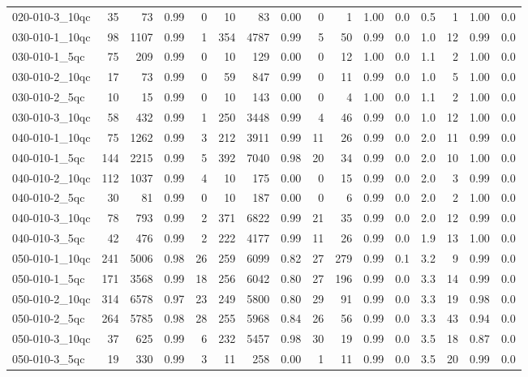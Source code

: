 \documentclass[twoside]{article}
\begin{document}
\begin{longtable}{l|rrrr|rrrr|rrr|rrrr}
		020-010-3\_10qc & 35 & 73 & 0.99 & 0 & 10 & 83 & 0.00 & 0 & 1 & 1.00 & 0.0 & 0.5 & 1 & 1.00 & 0.0 \\
		030-010-1\_10qc & 98 & 1107 & 0.99 & 1 & 354 & 4787 & 0.99 & 5 & 50 & 0.99 & 0.0 & 1.0 & 12 & 0.99 & 0.0 \\
		030-010-1\_5qc & 75 & 209 & 0.99 & 0 & 10 & 129 & 0.00 & 0 & 12 & 1.00 & 0.0 & 1.1 & 2 & 1.00 & 0.0 \\
		030-010-2\_10qc & 17 & 73 & 0.99 & 0 & 59 & 847 & 0.99 & 0 & 11 & 0.99 & 0.0 & 1.0 & 5 & 1.00 & 0.0 \\
		030-010-2\_5qc & 10 & 15 & 0.99 & 0 & 10 & 143 & 0.00 & 0 & 4 & 1.00 & 0.0 & 1.1 & 2 & 1.00 & 0.0 \\
		030-010-3\_10qc & 58 & 432 & 0.99 & 1 & 250 & 3448 & 0.99 & 4 & 46 & 0.99 & 0.0 & 1.0 & 12 & 1.00 & 0.0 \\
		040-010-1\_10qc & 75 & 1262 & 0.99 & 3 & 212 & 3911 & 0.99 & 11 & 26 & 0.99 & 0.0 & 2.0 & 11 & 0.99 & 0.0 \\
		040-010-1\_5qc & 144 & 2215 & 0.99 & 5 & 392 & 7040 & 0.98 & 20 & 34 & 0.99 & 0.0 & 2.0 & 10 & 1.00 & 0.0 \\
		040-010-2\_10qc & 112 & 1037 & 0.99 & 4 & 10 & 175 & 0.00 & 0 & 15 & 0.99 & 0.0 & 2.0 & 3 & 0.99 & 0.0 \\
		040-010-2\_5qc & 30 & 81 & 0.99 & 0 & 10 & 187 & 0.00 & 0 & 6 & 0.99 & 0.0 & 2.0 & 2 & 1.00 & 0.0 \\
		040-010-3\_10qc & 78 & 793 & 0.99 & 2 & 371 & 6822 & 0.99 & 21 & 35 & 0.99 & 0.0 & 2.0 & 12 & 0.99 & 0.0 \\
		040-010-3\_5qc & 42 & 476 & 0.99 & 2 & 222 & 4177 & 0.99 & 11 & 26 & 0.99 & 0.0 & 1.9 & 13 & 1.00 & 0.0 \\
		050-010-1\_10qc & 241 & 5006 & 0.98 & 26 & 259 & 6099 & 0.82 & 27 & 279 & 0.99 & 0.1 & 3.2 & 9 & 0.99 & 0.0 \\
		050-010-1\_5qc & 171 & 3568 & 0.99 & 18 & 256 & 6042 & 0.80 & 27 & 196 & 0.99 & 0.0 & 3.3 & 14 & 0.99 & 0.0 \\
		050-010-2\_10qc & 314 & 6578 & 0.97 & 23 & 249 & 5800 & 0.80 & 29 & 91 & 0.99 & 0.0 & 3.3 & 19 & 0.98 & 0.0 \\
		050-010-2\_5qc & 264 & 5785 & 0.98 & 28 & 255 & 5968 & 0.84 & 26 & 56 & 0.99 & 0.0 & 3.3 & 43 & 0.94 & 0.0 \\
		050-010-3\_10qc & 37 & 625 & 0.99 & 6 & 232 & 5457 & 0.98 & 30 & 19 & 0.99 & 0.0 & 3.5 & 18 & 0.87 & 0.0 \\
		050-010-3\_5qc & 19 & 330 & 0.99 & 3 & 11 & 258 & 0.00 & 1 & 11 & 0.99 & 0.0 & 3.5 & 20 & 0.99 & 0.0 \\

\end{longtable}
\end{document}
